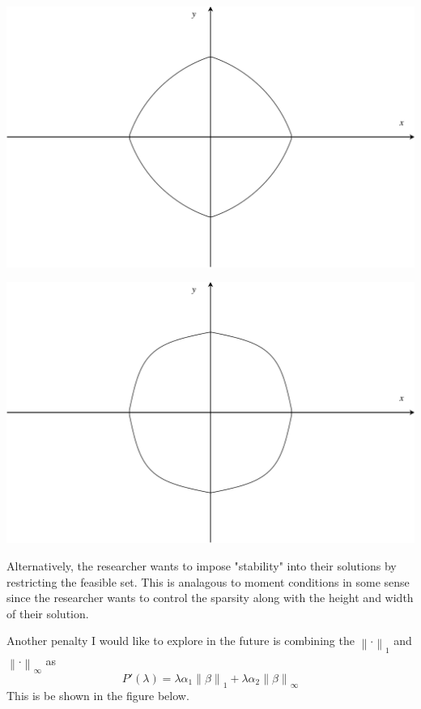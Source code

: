 \documentclass[12pt, a4paper, reqno]{article}
\newcommand{\forceindent}{\leavevmode{\parindent=1em\indent}}
\numberwithin{equation}{section}
\newcommand{\norm}[1]{\left\lVert#1\right\rVert}
\begin{document}
\begin{center}
\begin{minipage}{.5\textwidth}
  \centering
  \includegraphics[width=.9\linewidth]{elasticnet.pdf}
\end{minipage}%
\begin{minipage}{.5\textwidth}
  \centering
  \includegraphics[width=.9\linewidth]{new_penalty_4_moment.pdf}
\end{minipage}
\end{center}

Alternatively, the researcher wants to impose "stability" into their solutions by restricting the feasible set.
This is analagous to moment conditions in some sense since the researcher wants to control the sparsity along with the height and width of their solution.

\forceindent Another penalty I would like to explore in the future is combining the  $\norm{\cdot}_1$ and $\norm{\cdot}_\infty$ as
\[
P'(\lambda) = \lambda \alpha_1 \norm{\beta}_1 + \lambda \alpha_2 \norm{\beta}_\infty 
\]
This is be shown in the figure below.
\end{document}
